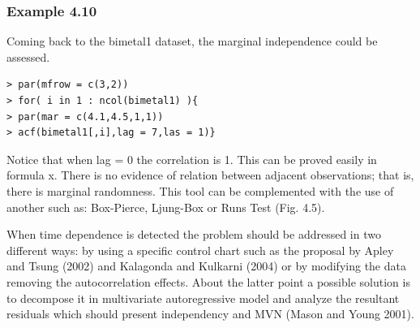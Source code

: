 \documentclass[]{beamer}
\begin{document}
\subsubsection{Example 4.10}
\begin{frame}[fragile]
Coming back to the bimetal1 dataset, the marginal independence could be assessed.
\begin{verbatim}
> par(mfrow = c(3,2))
> for( i in 1 : ncol(bimetal1) ){
> par(mar = c(4.1,4.5,1,1))
> acf(bimetal1[,i],lag = 7,las = 1)}
\end{verbatim}
\end{frame}
\begin{frame}
Notice that when lag = 0 the correlation is 1. This can be proved easily in formula x.
There is no evidence of relation between adjacent observations; that is, there is marginal randomness.
This tool can be complemented with the use of another such as: Box-Pierce, Ljung-Box or Runs Test (Fig. 4.5).

\end{frame}

\begin{frame}
When time dependence is detected the problem should be addressed in two different ways: by using a specific control chart such as the proposal by Apley and Tsung (2002) and Kalagonda and Kulkarni (2004) or by modifying the data removing the autocorrelation effects. About the latter point a possible solution is to decompose it in multivariate autoregressive model and analyze the resultant
residuals which should present independency and MVN (Mason and Young 2001).
\end{frame}
\end{document}
